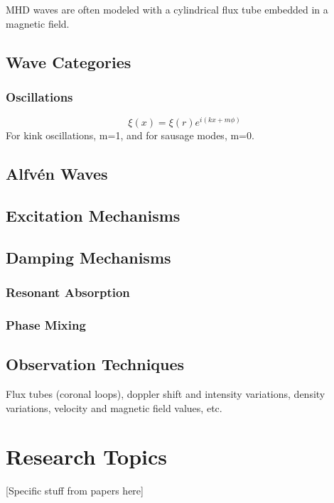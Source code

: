 \documentclass[preprint2]{aastex}
\begin{document}
MHD waves are often modeled with a cylindrical flux tube embedded
in a magnetic field.


\subsection{Wave Categories}
\subsubsection{Oscillations}
$$ \xi(x) = \xi(r)e^{i(kx+m\phi)} $$
For kink oscillations, m=1, and for sausage modes, m=0.
\subsection{Alfv\'en Waves}
\subsection{Excitation Mechanisms}
\subsection{Damping Mechanisms}
\subsubsection{Resonant Absorption}
\subsubsection{Phase Mixing}
\subsection{Observation Techniques}
Flux tubes (coronal loops), doppler shift and intensity variations,
density variations, velocity and magnetic field values,
etc.


\section{Research Topics}\label{topics}
[Specific stuff from papers here]
\end{document}
